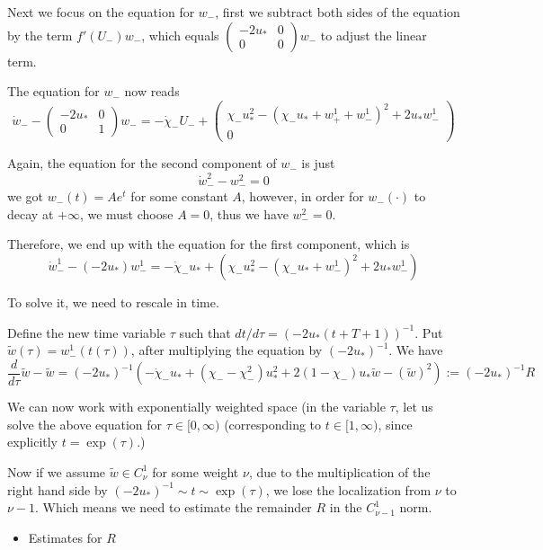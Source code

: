 \documentclass[letterpaper,11pt]{article}
\numberwithin{equation}{section}
\theoremstyle{plain}
\begin{document}
Next we focus on the equation for $w_-$, first we subtract both sides of the equation by the term $f'(U_-)w_-$, which equals $\begin{pmatrix}
-2u_*&0\\
0&0
\end{pmatrix} w_-$ to adjust the linear term.



The equation for $w_-$ now reads
\[
\dot{w}_- - \begin{pmatrix}
-2u_*&0\\
0&1
\end{pmatrix} w_-= -\dot{\chi}_- U_- + \begin{pmatrix}
\chi_-u_*^2-(\chi_-u_*+w_+^1+w_-^1)^2 +2u_*w_-^1\\
0
\end{pmatrix}
\]

Again, the equation for the second component of $w_-$ is just
\[
\dot{w}_-^2 - w_-^2 = 0 
\]
we got $w_-(t) = A e^t$ for some constant $A$, however, in order for $w_-(\cdot)$ to decay at $+\infty$, we must choose $A=0$, thus we have $w_-^2 = 0$.

Therefore, we end up with the equation for the first component, which is
\[
\dot{w}_-^1 - (-2u_*)w_-^1 = -\dot{\chi}_- u_* + (\chi_-u_*^2 - (\chi_-u_*+w_-^1)^2 + 2u_*w_-^1)
\]

To solve it, we need to rescale in time.

Define the new time variable $\tau$ such that $dt/d\tau = (-2u_*(t+T+1))^{-1}$. Put $\tilde{w}(\tau) = w_-^1(t(\tau))$, after multiplying the equation by $(-2u_*)^{-1}$. We have
\[
\frac{d}{d\tau} \tilde{w} - \tilde{w} = (-2u_*)^{-1}\left( -\dot{\chi}_-u_* + (\chi_--\chi_-^2)u_*^2 +2(1-\chi_-)u_* \tilde{w} -(\tilde{w})^2 \right) := (-2u_*)^{-1} R
\] 

We can now work with exponentially weighted space (in the variable $\tau$, let us solve the above equation for $ \tau \in [0,\infty)$ (corresponding to $t \in [1,\infty)$, since explicitly $t = \exp(\tau)$.)

Now if we assume $\tilde{w} \in C^1_\nu$ for some weight $\nu$, due to the multiplication of the right hand side by $(-2u_*)^{-1} \sim t \sim \exp(\tau)$, we lose the localization from $\nu$ to $\nu-1$. Which means we need to estimate the remainder $R$ in the $C_{\nu-1}^1$ norm.

\begin{itemize}
\item Estimates for $R$
\end{itemize}
\end{document}
